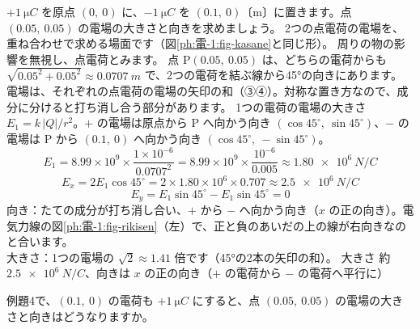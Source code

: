 \label{ph:電-1:ex4}
\begin{phreidai}[2つの電荷の電場を矢印でたす]
$+\qty{1}{\micro C}$ を原点 $(0,\ 0)$ に、$-\qty{1}{\micro C}$ を $(0.1,\ 0)$〔m〕に置きます。点 $(0.05,\ 0.05)$ の電場の大きさと向きを求めましょう。
\phbamen
2つの点電荷の電場を、重ね合わせで求める場面です（図\ref{ph:電-1:fig-kasane}と同じ形）。
\phmushi
周りの物の影響を無視し、点電荷とみます。
\phzu
点 P$(0.05,\ 0.05)$ は、どちらの電荷からも $\sqrt{0.05^2+0.05^2}\approx\qty{0.0707}{m}$ で、2つの電荷を結ぶ線から45°の向きにあります。
\phriyu
電場は、それぞれの点電荷の電場の矢印の和（③④）。対称な置き方なので、成分に分けると打ち消し合う部分があります。
\phtateru
1つの電荷の電場の大きさ $E_1=k\,|Q|/r^2$。$+$ の電場は原点から P へ向かう向き $(\cos45^\circ,\ \sin45^\circ)$、$-$ の電場は P から $(0.1,\ 0)$ へ向かう向き $(\cos45^\circ,\ -\sin45^\circ)$。
\phtoku
\[E_1=8.99\times10^9\times\frac{1\times10^{-6}}{0.0707^2}=8.99\times10^9\times\frac{10^{-6}}{0.005}\approx\qty{1.80e6}{N/C}\]
\[E_x=2E_1\cos45^\circ=2\times1.80\times10^6\times0.707\approx\qty{2.5e6}{N/C}\]
\[E_y=E_1\sin45^\circ-E_1\sin45^\circ=0\]
\phtashikame
向き：たての成分が打ち消し合い、$+$ から $-$ へ向かう向き（$x$ の正の向き）。電気力線の図\ref{ph:電-1:fig-rikisen}（左）で、正と負のあいだの上の線が右向きなのと合います。\\
大きさ：1つの電場の $\sqrt2\approx1.41$ 倍です（45°の2本の矢印の和）。
\kotae 大きさ 約 $\qty{2.5e6}{N/C}$、向きは $x$ の正の向き（$+$ の電荷から $-$ の電荷へ平行に）
\end{phreidai}
\begin{jibun}
例題4で、$(0.1,\ 0)$ の電荷も $+\qty{1}{\micro C}$ にすると、点 $(0.05,\ 0.05)$ の電場の大きさと向きはどうなりますか。
\end{jibun}

